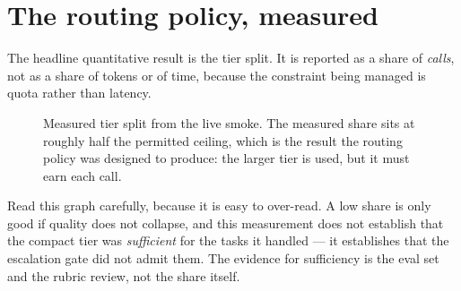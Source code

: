 \section{The routing policy, measured}
\label{sec:metrics-live}

The headline quantitative result is the tier split. It is reported as a share of
\emph{calls}, not as a share of tokens or of time, because the constraint being managed is
quota rather than latency.

\begin{figure}[htbp]
\centering
{}
\caption{Measured tier split from the live smoke. The measured share sits at roughly half
the permitted ceiling, which is the result the routing policy was designed to produce: the
larger tier is used, but it must earn each call.}
\label{fig:lshare}
\end{figure}

Read this graph carefully, because it is easy to over-read. A low share is only good if
quality does not collapse, and this measurement does not establish that the compact tier
was \emph{sufficient} for the tasks it handled --- it establishes that the escalation gate
did not admit them. The evidence for sufficiency is the eval set and the rubric review,
not the share itself.

